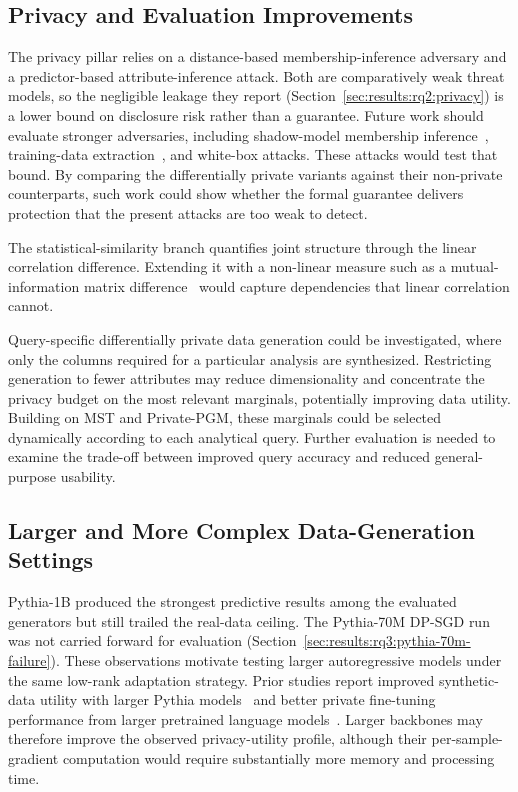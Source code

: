 \subsection{Privacy and Evaluation Improvements}
\label{sec:conclusion:future:privacy-evaluation}
\label{sec:conclusion:future:adversaries}
\label{sec:conclusion:future:nonlinear}

The privacy pillar relies on a distance-based membership-inference adversary
and a predictor-based attribute-inference attack. Both are comparatively weak
threat models, so the negligible leakage they report
(Section~\ref{sec:results:rq2:privacy}) is a lower bound on disclosure risk
rather than a guarantee. Future work should evaluate stronger adversaries, 
including shadow-model membership inference~\cite{Shokri2017MIA}, training-data 
extraction~\cite{Carlini2021Extracting}, and white-box attacks. These attacks 
would test that bound. By comparing the differentially private variants against 
their non-private counterparts, such work could show whether the formal guarantee 
delivers protection that the present attacks are too weak to detect.

The statistical-similarity branch quantifies joint structure through the linear
correlation difference. Extending it with a non-linear measure such as a
mutual-information matrix difference~\cite{lautrup2025syntheval} would capture
dependencies that linear correlation cannot.

Query-specific differentially private data generation could be investigated,
where only the columns required for a particular analysis are synthesized. 
Restricting generation to fewer attributes may reduce dimensionality and 
concentrate the privacy budget on the most relevant marginals, potentially 
improving data utility. Building on MST and Private-PGM, these marginals 
could be selected dynamically according to each analytical query. Further 
evaluation is needed to examine the trade-off between improved query 
accuracy and reduced general-purpose usability\cite{McKenna2021NIST}.

\subsection{Larger and More Complex Data-Generation Settings}
\label{sec:conclusion:future:larger-complex}
\label{sec:conclusion:future:llm}
\label{sec:conclusion:future:longitudinal}

Pythia-1B produced the strongest predictive results among the evaluated
generators but still trailed the real-data ceiling. The Pythia-70M DP-SGD
run was not carried forward for evaluation
(Section~\ref{sec:results:rq3:pythia-70m-failure}). These observations motivate
testing larger autoregressive models under the same low-rank adaptation
strategy. Prior studies report improved synthetic-data utility with larger
Pythia models~\cite{Miletic2024} and better private fine-tuning performance
from larger pretrained language models~\cite{Li2022LargeDP}. Larger backbones
may therefore improve the observed privacy-utility profile, although their
per-sample-gradient computation would require substantially more memory and
processing time.

